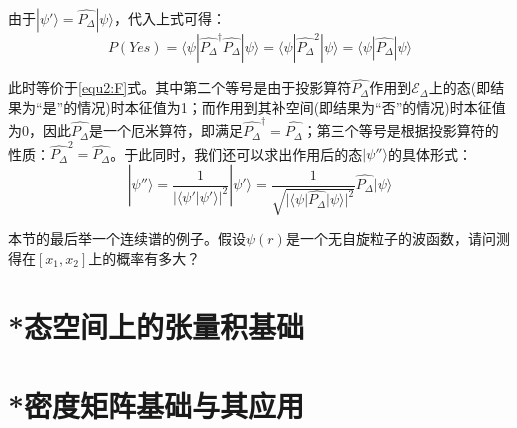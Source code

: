     由于$|\psi'\rangle=\hat{P_\Delta}|\psi\rangle$，代入上式可得：
    \begin{equation}
        P(Yes)=\langle\psi|\hat{P_\Delta}^\dagger\hat{P_\Delta}|\psi\rangle=\langle\psi|\hat{P_\Delta}^2|\psi\rangle=\langle\psi|\hat{P_\Delta}|\psi\rangle
    \end{equation}
    
    此时等价于\eqref{equ2:F}式。其中第二个等号是由于投影算符$\hat{P_\Delta}$作用到$\mathscr{E}_\Delta$上的态(即结果为“是”的情况)时本征值为1；而作用到其补空间(即结果为“否”的情况)时本征值为0，因此$\hat{P_\Delta}$是一个厄米算符，即满足$\hat{P_\Delta}^\dagger=\hat{P_\Delta}$；第三个等号是根据投影算符的性质：$\hat{P_\Delta}^2=\hat{P_\Delta}$。于此同时，我们还可以求出作用后的态$|\psi''\rangle$的具体形式：
    \begin{equation}
        |\psi''\rangle=\frac{1}{|\langle\psi'|\psi'\rangle|^2}|\psi'\rangle=\frac{1}{\sqrt{|\langle\psi|\hat{P_\Delta}|\psi\rangle|^2}}\hat{P_\Delta}|\psi\rangle
    \end{equation}
    
    本节的最后举一个连续谱的例子。假设$\psi(r)$是一个无自旋粒子的波函数，请问测得在$[x_1,x_2]$上的概率有多大？
\section{*态空间上的张量积基础}

\section{*密度矩阵基础与其应用}


